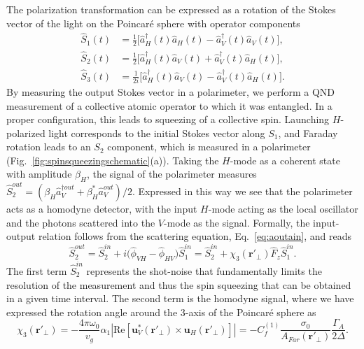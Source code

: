 \documentclass[preprint,aps,pra,onecolumn,superscriptaddress]{revtex4-1} %
\newcommand{\mbf}[1]{\mathbf{#1}}
\newcommand{\smallfrac}[2]{\mbox{$\frac{#1}{#2}$}}
\newcommand{\Poincare}{Poincar\'e\xspace}
\begin{document}
The polarization transformation can be expressed as a rotation of the Stokes vector of the light on the \Poincare sphere with operator components
\begin{subequations}\label{Eq::StokesComponents}
	\begin{align}
		\hat{S}_1(t) & = \smallfrac{1}{2}\big[ \hat{a}^\dag_H(t) \hat{a}_H(t)-\hat{a}^\dag_V(t) \hat{a}_V(t) \big], \\
	 	\hat{S}_2(t) & = \smallfrac{1}{2}\big[ \hat{a}^\dag_H(t) \hat{a}_V(t)+\hat{a}^\dag_V(t) \hat{a}_H(t) \big], \\ 
		\hat{S}_3(t) & = \smallfrac{1}{2i}\big[ \hat{a}^\dag_H(t) \hat{a}_V(t) -\hat{a}^\dag_V(t) \hat{a}_H(t) \big].
	\end{align}
\end{subequations}
By measuring the output Stokes vector in a polarimeter, we perform a QND measurement of a collective atomic operator to which it was entangled.  In a proper configuration, this leads to squeezing of a collective spin.  Launching $H$-polarized light corresponds to the initial Stokes vector along $S_1$, and Faraday rotation leads to an $S_2$ component, which is measured in a polarimeter (Fig.~\ref{fig:spinsqueezingschematic}(a)).  Taking the $H$-mode as a coherent state with amplitude $\beta_H$, the signal of the polarimeter measures $\hat{S}_2^{out} = (\beta_H \hat{a}_V^{\dag out} +\beta^*_H \hat{a}_V^{out})/2$.  Expressed in this way we see that the polarimeter acts as a homodyne detector, with the input $H$-mode acting as the local oscillator and the photons scattered into the $V$-mode as the signal.  Formally, the input-output relation follows from the scattering equation, Eq.~\eqref{eq:aoutain}, and reads
\begin{equation}
\hat{S}^{out}_2 = \hat{S}^{in}_2 +i \big( \hat{\phi}_{VH}- \hat{\phi}_{HV} \big) \hat{S}^{in}_1 =  \hat{S}^{in}_2 + \chi_3(\mbf{r}'_\perp) \hat{F}_z \hat{S}^{in}_1.
\end{equation}
The first term $\hat{S}^{in}_2$ represents the shot-noise that fundamentally limits the resolution of the measurement and thus the spin squeezing that can be obtained in a given time interval.  The second term is the homodyne signal, where we have expressed the rotation angle around the 3-axis of the \Poincare sphere as
\begin{equation}
\chi_3(\mbf{r}'_\perp) = -\frac{4 \pi \omega_0}{v_g} \alpha_1 \left\vert \text{Re} \left[ \mbf{u}^*_V (\mbf{r}'_\perp) \times \mbf{u}_H (\mbf{r}'_\perp) \right] \right\vert =-C^{(1)}_f  \frac{\sigma_0}{A_{Far}(\mbf{r}'_\perp)} \frac{\Gamma_A}{2 \Delta}.
\end{equation}
\end{document}
